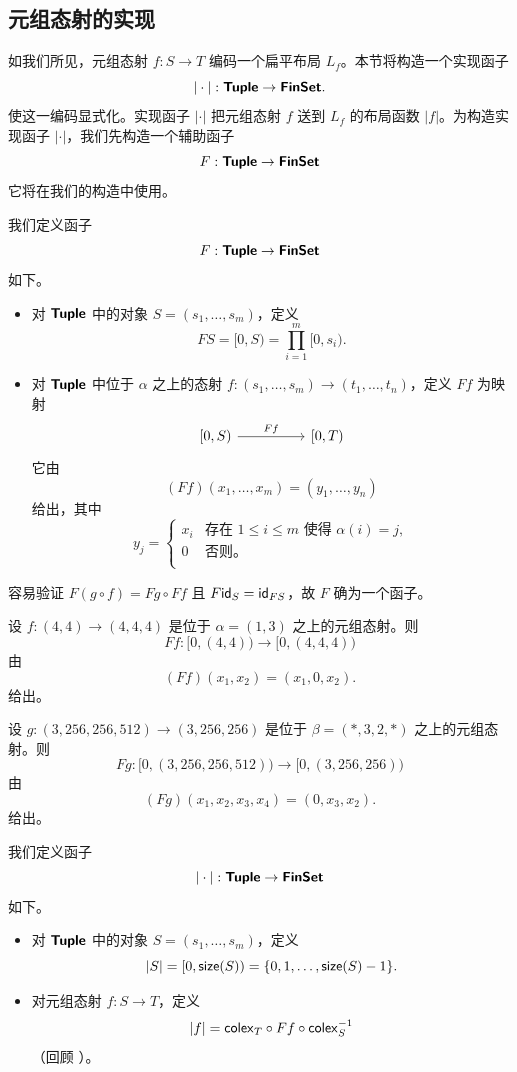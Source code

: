 \subsection{元组态射的实现}
\noindent 如我们所见，元组态射 $f:S \to T$ 编码一个扁平布局 $L_f$。本节将构造一个实现函子
\[
| \cdot |:{\boldsymbol{\mathsf{Tuple}}} \to {\boldsymbol{\mathsf{FinSet}}}.
\]
使这一编码显式化。实现函子 $| \cdot |$ 把元组态射 $f$ 送到 $L_f$ 的布局函数 $|f|$。为构造实现函子 $| \cdot |$，我们先构造一个辅助函子
\[
F:{\boldsymbol{\mathsf{Tuple}}} \to {\boldsymbol{\mathsf{FinSet}}}
\]
它将在我们的构造中使用。
\begin{construction}\label{constructionofauxiliaryfunctoronC} 我们定义函子
\[F:{\boldsymbol{\mathsf{Tuple}}} \to {\boldsymbol{\mathsf{FinSet}}}\]
如下。
\begin{itemize}
\item 对 ${\boldsymbol{\mathsf{Tuple}}}$ 中的对象 $S = (s_1,\dots,s_m)$，定义
\[
FS = [0,S) = \prod_{i=1}^m  [0,s_i).
\]
\item 对 ${\boldsymbol{\mathsf{Tuple}}}$ 中位于 $\alpha$ 之上的态射 $f:(s_1,\dots,s_m) \to (t_1,\dots,t_n)$，定义 $Ff$ 为映射
\[\begin{tikzcd}
{[}0,S{)} \ar[rr,"Ff"] & & {[}0,T{)}
\end{tikzcd} \]
它由
\[
(Ff)(x_1,\dots,x_m) = (y_1,\dots,y_n)
\]
给出，其中
\[
y_j= \begin{cases}
    x_i & \text{存在 }1 \leq i \leq m\text{ 使得 }\alpha(i) = j,\\
    0 & \text{否则。}\\
\end{cases}
\]
\end{itemize}
\end{construction}

\noindent 容易验证 $F(g \circ f) = Fg \circ Ff$ 且 $F \mathsf{id}_S = \mathsf{id}_{FS}$，故 $F$ 确为一个函子。

\begin{example}
    设 $f:(4,4) \to (4,4,4)$ 是位于 $\alpha = (1,3)$ 之上的元组态射。则
    \[
    Ff : [0,(4,4))
    \to [0,(4,4,4))
    \]
    由
    \[
    (Ff)(x_1,x_2) = (x_1,0,x_2).
    \]
    给出。
\end{example}

\begin{example}
    设 $g:(3,256,256,512) \to (3,256,256)$ 是位于 $\beta = (*,3,2,*)$ 之上的元组态射。则
    \[
    Fg : [0,(3,256,256,512))
    \to [0,(3,256,256))
    \]
    由
    \[
    (Fg)(x_1,x_2,x_3,x_4) = (0,x_3,x_2).
    \]
    给出。
\end{example}

\begin{construction}\label{constructionofrealizationfunctoronC} 我们定义函子
\[|\cdot |:{\boldsymbol{\mathsf{Tuple}}} \to {\boldsymbol{\mathsf{FinSet}}}\]
如下。
\begin{itemize}
\item 对 ${\boldsymbol{\mathsf{Tuple}}}$ 中的对象 $S = (s_1,\dots,s_m)$，定义
\[
|S| = [0,\mathsf{size}(S)) = \{0,1,\dots,\mathsf{size}(S)-1\}.
\]
\item 对元组态射 $f:S \to T$，定义
\[
|f| = \mathsf{colex}_T \circ Ff \circ \mathsf{colex}_S^{-1}
\]
（回顾 ）。
\end{itemize}
\end{construction}

